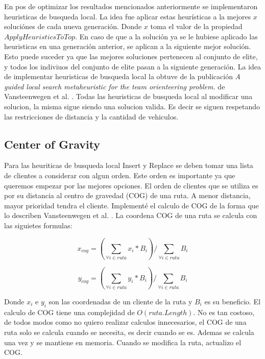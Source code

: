 En pos de optimizar los resultados mencionados anteriormente se implementaron heuristicas de busqueda local. La idea fue aplicar estas heurísticas a la mejores $x$ soluciónes de cada nueva generación. Donde $x$ toma el valor de la propiedad $ApplyHeuristicsToTop$. En caso de que a la solución ya se le hubiese aplicado las heuristicas en una generación anterior, se aplican a la siguiente mejor solución. Esto puede suceder ya que las mejores soluciones pertenecen al conjunto de elite, y todos los indiviuos del conjunto de elite pasan a la siguiente generación. La idea de implementar heuristicas de busqueda local la obtuve de la publicación \textit{A guided local search metaheuristic for the team orienteering problem.} de Vansteenwegen et al. \cite{VansteenwegenSouffriauBergheOudheusden}. Todas las heuristicas de busqueda local al modificar una solucion, la misma sigue siendo una solucion valida. Es decir se siguen respetando las restricciones de distancia y la cantidad de vehiculos. 

\subsection{Center of Gravity}

Para las heuriticas de busqueda local Insert y Replace se deben tomar una lista de clientes a considerar con algun orden. Este orden es importante ya que queremos empezar por las mejores opciones. El orden de clientes que se utiliza es por su distancia al centro de gravedad (COG) de una ruta. A menor distancia, mayor prioridad tendra el cliente. Implementé el calculo de COG de la forma que lo describen Vansteenwegen et al. \cite{VansteenwegenSouffriauBergheOudheusden}. La coordena COG de una ruta se calcula con las siguietes formulas:

\begin{equation}
x_{cog} = (\sum_{\forall i \in ruta} x_i * B_i) / \sum_{\forall i \in ruta} B_i
\end{equation}

\begin{equation}
y_{cog} = (\sum_{\forall i \in ruta} y_i * B_i) / \sum_{\forall i \in ruta} B_i
\end{equation}

\bigskip

Donde $x_i$ e $y_i$ son las coordenadas de un cliente de la ruta y $B_i$ es su beneficio.
El calculo de COG tiene una complejidad de $O(ruta.Length)$. No es tan costoso, de todos modos como no quiero realizar calculos innecesarios, el COG de una ruta solo se calcula cuando se necesita, es decir cuando se es. Ademas se calcula una vez y se mantiene en memoria. Cuando se modifica la ruta, actualizo el COG.

